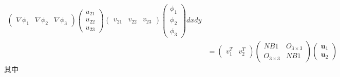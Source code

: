 \documentclass{ctexart}
\begin{document}
\begin{align*}
    \begin{pmatrix}
     \nabla \phi_1 & \nabla \phi_2 & \nabla \phi_3
    \end{pmatrix}
    \begin{pmatrix}
     u_{21}\\
     u_{22}\\
     u_{23}
    \end{pmatrix}
    \begin{pmatrix}
     v_{21} & v_{22} & v_{23}
    \end{pmatrix}
    \begin{pmatrix}
     \phi_1\\
     \phi_2\\
    \phi_3
    \end{pmatrix}dxdy\\
    & = \begin{pmatrix}
      v_1^T& v_2^T
    \end{pmatrix}
    \begin{pmatrix}
      NB1& O_{3 \times 3}\\
      O_{3 \times 3} & NB1
    \end{pmatrix}
    \begin{pmatrix}
     \boldsymbol{u}_1\\
     \boldsymbol{u}_2
    \end{pmatrix}
\end{align*}
其中
\end{document}

